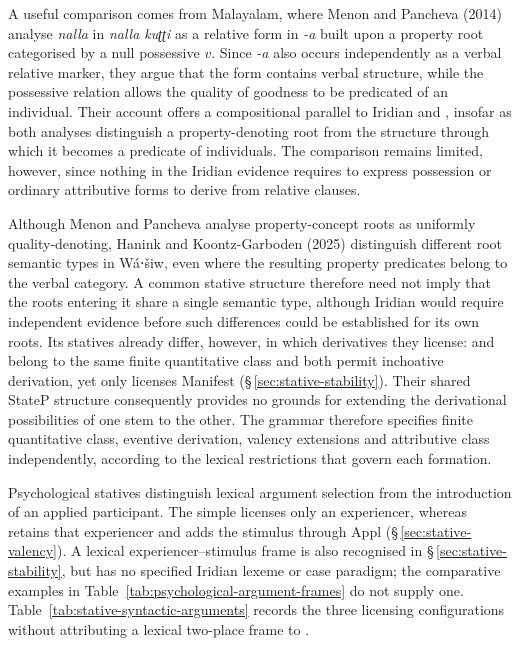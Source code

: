 A useful comparison comes from Malayalam, where Menon and Pancheva (2014)
\cite[§3.1, pp.~291--293]{menonpancheva2014} analyse \textit{nalla}
 in \textit{nalla kuʈʈi}  as a relative
form in \textit{-a} built upon a property root categorised by a null
possessive $v$. Since \textit{-a} also occurs independently as a verbal
relative marker, they argue that the form contains verbal structure, while
the possessive relation allows the quality of goodness to be predicated
of an individual. Their account offers a compositional parallel to Iridian
  and  , insofar as
both analyses distinguish a property-denoting root from the structure
through which it becomes a predicate of individuals. The comparison
remains limited, however, since nothing in the Iridian evidence requires
 to express possession or ordinary attributive forms to derive
from relative clauses.

Although Menon and Pancheva analyse property-concept roots as uniformly
quality-denoting, Hanink and Koontz-Garboden (2025)
\cite[§§1--2]{haninkkoontzgarboden2025} distinguish different root
semantic types in Wá⋅šiw, even where the resulting property predicates
belong to the verbal category. A common stative structure therefore need
not imply that the roots entering it share a single semantic type,
although Iridian would require independent evidence before such
differences could be established for its own roots. Its statives already
differ, however, in which derivatives they license: 
 and   belong to the same finite
quantitative class and both permit inchoative derivation, yet only
 licenses Manifest (§\,\ref{sec:stative-stability}). Their
shared StateP structure consequently provides no grounds for extending
the derivational possibilities of one stem to the other. The grammar
therefore specifies finite quantitative class, eventive derivation,
valency extensions and attributive class independently, according to the
lexical restrictions that govern each formation.

Psychological statives distinguish lexical argument selection from the
introduction of an applied participant. The simple 
 licenses only an experiencer, whereas
 retains that experiencer and adds the stimulus through
Appl (§\,\ref{sec:stative-valency}). A lexical experiencer--stimulus
frame is also recognised in §\,\ref{sec:stative-stability}, but has no
specified Iridian lexeme or case paradigm; the comparative examples in
Table~\ref{tab:psychological-argument-frames} do not supply one.
Table~\ref{tab:stative-syntactic-arguments} records the three licensing
configurations without attributing a lexical two-place frame to
.

